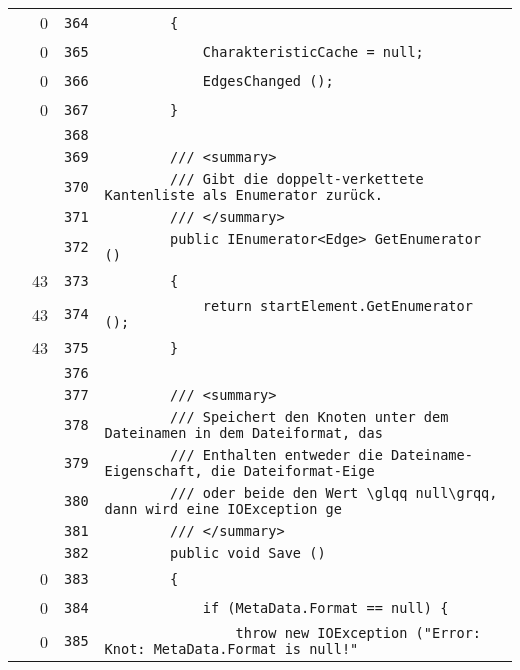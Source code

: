 \documentclass[a4paper,10pt]{article}
\begin{document}
\begin{longtable}[l]{lrrl}
\cellcolor{red} & 0 & \verb~364~ & \verb~        {~\\
\cellcolor{red} & 0 & \verb~365~ & \verb~            CharakteristicCache = null;~\\
\cellcolor{red} & 0 & \verb~366~ & \verb~            EdgesChanged ();~\\
\cellcolor{red} & 0 & \verb~367~ & \verb~        }~\\
\cellcolor{gray} &  & \verb~368~ & \verb~~\\
\cellcolor{gray} &  & \verb~369~ & \verb~        /// <summary>~\\
\cellcolor{gray} &  & \verb~370~ & \verb~        /// Gibt die doppelt-verkettete Kantenliste als Enumerator zurück.~\\
\cellcolor{gray} &  & \verb~371~ & \verb~        /// </summary>~\\
\cellcolor{gray} &  & \verb~372~ & \verb~        public IEnumerator<Edge> GetEnumerator ()~\\
\cellcolor{green} & 43 & \verb~373~ & \verb~        {~\\
\cellcolor{green} & 43 & \verb~374~ & \verb~            return startElement.GetEnumerator ();~\\
\cellcolor{green} & 43 & \verb~375~ & \verb~        }~\\
\cellcolor{gray} &  & \verb~376~ & \verb~~\\
\cellcolor{gray} &  & \verb~377~ & \verb~        /// <summary>~\\
\cellcolor{gray} &  & \verb~378~ & \verb~        /// Speichert den Knoten unter dem Dateinamen in dem Dateiformat, das ~\\
\cellcolor{gray} &  & \verb~379~ & \verb~        /// Enthalten entweder die Dateiname-Eigenschaft, die Dateiformat-Eige~\\
\cellcolor{gray} &  & \verb~380~ & \verb~        /// oder beide den Wert \glqq null\grqq, dann wird eine IOException ge~\\
\cellcolor{gray} &  & \verb~381~ & \verb~        /// </summary>~\\
\cellcolor{gray} &  & \verb~382~ & \verb~        public void Save ()~\\
\cellcolor{red} & 0 & \verb~383~ & \verb~        {~\\
\cellcolor{red} & 0 & \verb~384~ & \verb~            if (MetaData.Format == null) {~\\
\cellcolor{red} & 0 & \verb~385~ & \verb~                throw new IOException ("Error: Knot: MetaData.Format is null!"~\\

\end{longtable}
\end{document}
